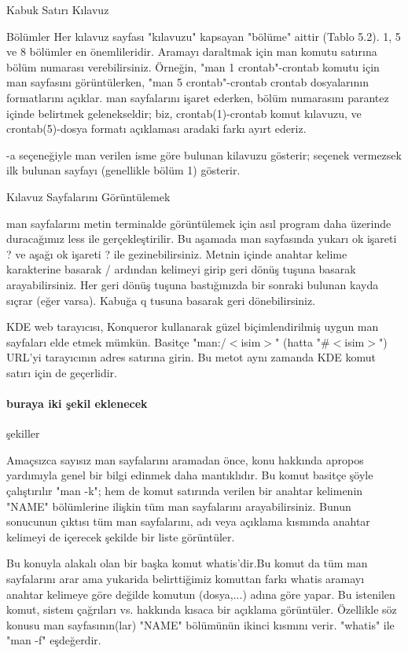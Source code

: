 \begin{section}{Kabuk Satırı Kılavuz}
\begin{subsection}{Bölümler}
Her kılavuz sayfası "kılavuzu" kapsayan "bölüme" aittir (Tablo 5.2). 1, 5 ve 8 bölümler en önemlileridir. Aramayı daraltmak için man komutu satırına bölüm numarası verebilirsiniz. Örneğin, "man 1 crontab"-crontab komutu için man sayfasını görüntülerken, "man 5 crontab"-crontab crontab dosyalarının formatlarını açıklar. man sayfalarını işaret ederken, bölüm numarasını parantez içinde belirtmek gelenekseldir; biz, crontab(1)-crontab komut kılavuzu, ve crontab(5)-dosya formatı açıklaması aradaki farkı ayırt ederiz.

-a seçeneğiyle man verilen isme göre bulunan kilavuzu gösterir; seçenek vermezsek ilk bulunan sayfayı (genellikle bölüm 1) gösterir.
\end{subsection}
\begin{subsection}{Kılavuz Sayfalarını Görüntülemek }

man sayfalarını metin terminalde görüntülemek için asıl program daha üzerinde duracağımız less ile gerçekleştirilir. Bu aşamada man sayfasında yukarı ok işareti ? ve aşağı ok işareti ? ile gezinebilirsiniz. Metnin içinde anahtar kelime karakterine basarak / ardından kelimeyi girip geri dönüş tuşuna basarak arayabilirsiniz. Her geri dönüş tuşuna bastığınızda bir sonraki bulunan kayda sıçrar (eğer varsa). Kabuğa q tusuna basarak geri dönebilirsiniz.

KDE web tarayıcısı, Konqueror kullanarak güzel biçimlendirilmiş uygun man sayfaları elde etmek mümkün. Basitçe "man:/$<$isim$>$" (hatta "\#$<$isim$>$") URL'yi tarayıcının adres satırına girin. Bu metot aynı zamanda KDE komut satırı için de geçerlidir.

\paragraph{buraya iki şekil eklenecek}{şekiller}

Amaçsızca sayısız man sayfalarını aramadan önce, konu hakkında apropos yardımıyla genel bir bilgi edinmek daha mantıklıdır. Bu komut basitçe şöyle çalıştırılır "man -k"; hem de komut satırında verilen bir anahtar kelimenin "NAME" bölümlerine ilişkin tüm man sayfalarını arayabilirsiniz. Bunun sonucunun çıktısı tüm man sayfalarını, adı veya açıklama kısmında anahtar kelimeyi de içerecek şekilde bir liste görüntüler.

Bu konuyla alakalı olan bir başka komut whatis'dir.Bu komut da tüm man sayfalarını arar ama yukarida belirttiğimiz komuttan farkı whatis aramayı anahtar kelimeye göre değilde komutun (dosya,...) adına göre yapar. Bu istenilen komut, sistem çağrıları vs. hakkında kısaca bir açıklama görüntüler. Özellikle söz konusu man sayfasının(lar) "NAME" bölümünün ikinci  kısmını verir. "whatis" ile "man -f" eşdeğerdir.

\end{subsection}
\end{section}
